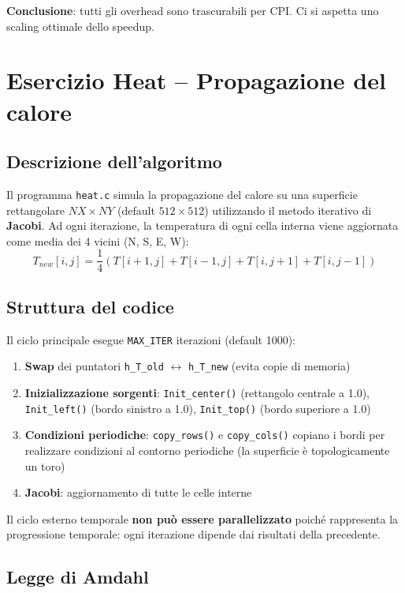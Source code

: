 \documentclass[a4paper,12pt]{article}
\begin{document}
\textbf{Conclusione}: tutti gli overhead sono trascurabili per CPI. Ci si aspetta uno scaling ottimale dello speedup.

\section{Esercizio Heat -- Propagazione del calore}

\subsection{Descrizione dell'algoritmo}

Il programma \texttt{heat.c} simula la propagazione del calore su una superficie rettangolare $NX \times NY$ (default $512 \times 512$) utilizzando il metodo iterativo di \textbf{Jacobi}. Ad ogni iterazione, la temperatura di ogni cella interna viene aggiornata come media dei 4 vicini (N, S, E, W):
\[
T_{new}[i,j] = \frac{1}{4}\left(T[i+1,j] + T[i-1,j] + T[i,j+1] + T[i,j-1]\right)
\]

\subsection{Struttura del codice}

Il ciclo principale esegue \texttt{MAX\_ITER} iterazioni (default 1000):
\begin{enumerate}
    \item \textbf{Swap} dei puntatori \texttt{h\_T\_old} $\leftrightarrow$ \texttt{h\_T\_new} (evita copie di memoria)
    \item \textbf{Inizializzazione sorgenti}: \texttt{Init\_center()} (rettangolo centrale a 1.0), \texttt{Init\_left()} (bordo sinistro a 1.0), \texttt{Init\_top()} (bordo superiore a 1.0)
    \item \textbf{Condizioni periodiche}: \texttt{copy\_rows()} e \texttt{copy\_cols()} copiano i bordi per realizzare condizioni al contorno periodiche (la superficie \`e topologicamente un toro)
    \item \textbf{Jacobi}: aggiornamento di tutte le celle interne
\end{enumerate}

Il ciclo esterno temporale \textbf{non pu\`o essere parallelizzato} poich\'e rappresenta la progressione temporale: ogni iterazione dipende dai risultati della precedente.

\subsection{Legge di Amdahl}
\end{document}
